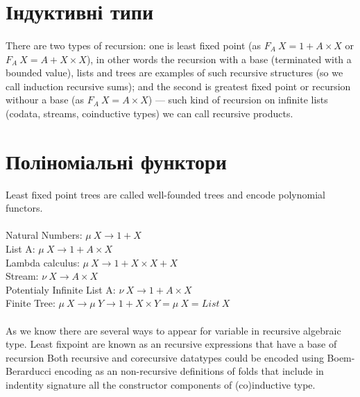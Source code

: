 \newpage
  \section{Індуктивні типи}

  \paragraph{}
  There are two types of recursion: one is least fixed point (as $F_A\ X = 1 + A\times X$
  or $F_A\ X = A + X\times X$), in other words the recursion with a base (terminated with a bounded value),
  lists and trees are examples of such recursive structures (so we call induction recursive sums);
  and the second is greatest fixed point or recursion withour a base (as $F_A\ X = A\times X $) ---
  such kind of recursion on infinite lists (codata, streams, coinductive types) we can call recursive products.\\

  \section{Поліноміальні функтори}
  Least fixed point trees are called well-founded trees and encode polynomial functors.

  \paragraph{}
  Natural Numbers: $\mu\ X \rightarrow 1 + X$\\
  List A: $\mu\ X \rightarrow 1 + A \times X$\\
  Lambda calculus: $\mu\ X \rightarrow 1 + X \times X + X$\\
  Stream: $\nu\ X \rightarrow A \times X$\\
  Potentialy Infinite List A: $\nu\ X \rightarrow 1 + A \times X$\\
  Finite Tree: $\mu\ X \rightarrow \mu\ Y \rightarrow 1 + X \times Y = \mu\ X = List\ X$\\

  \paragraph{}
  As we know there are several ways to appear for variable in recursive algebraic type.
  Least fixpoint are known as an recursive expressions that have a base of recursion
  Both recursive and corecursive datatypes could be encoded using Boem-Berarducci encoding
  as an non-recursive definitions of folds that include in indentity signature all the
  constructor components of (co)inductive type.
\newpage
